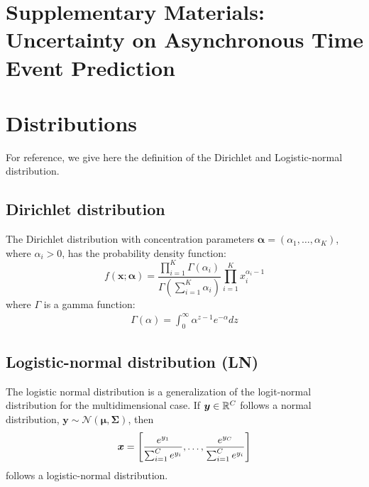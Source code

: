 \section*{Supplementary Materials: Uncertainty on Asynchronous Time Event Prediction}
\section{Distributions}\label{distributions}

For reference, we give here the definition of the Dirichlet and Logistic-normal distribution.

\subsection{Dirichlet distribution}

The Dirichlet distribution with concentration parameters $\bm \alpha = ( \alpha_1, \dots, \alpha_K )$, where $\alpha_i > 0$, has the probability density function:
\begin{equation}
    f(\bm x; \bm \alpha) =
    \frac{\prod_{i=1}^K \Gamma(\alpha_i)}{\Gamma\left( \sum_{i=1}^K \alpha_i \right)}
    \prod_{i=1}^K x_i^{\alpha_i - 1}
\end{equation}
where $\Gamma$ is a gamma function:
\begin{align*}
    \Gamma(\alpha) = \int_0^\infty \alpha^{z-1} e^{-\alpha} dz
\end{align*}

\subsection{Logistic-normal distribution (LN)}

The logistic normal distribution is a generalization of the logit-normal distribution for the multidimensional case. If $\bm y \in \mathbb{R}^{C}$ follows a normal distribution, $\bm y \sim \mathcal{N}(\bm \mu, \bm \Sigma)$, then
\begin{align*}
    \bm x = \left[
        \frac{e^{y_1}}{\sum_{i=1}^{C} e^{y_i}},
        \dots,
        \frac{e^{y_{C}}}{\sum_{i=1}^{C} e^{y_i}}
    \right]
\end{align*}
follows a logistic-normal distribution.
